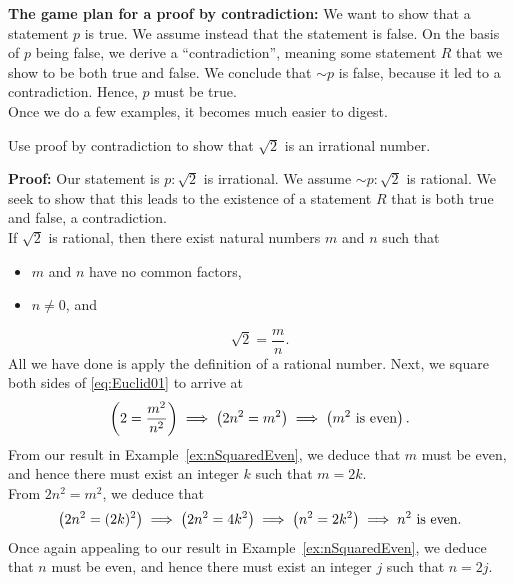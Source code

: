 \textbf{The game plan for a proof by contradiction:} We want to show that a statement $p$ is true. We assume instead that the statement is false. On the basis of $p$ being false, we derive a ``contradiction'', meaning some statement $R$ that we show to be both true and false. We conclude that $\sim p$ is false, because it led to a contradiction. Hence, $p$ must be true.\\

Once we do a few examples, it becomes much easier to digest. 

\vspace*{.2cm}

\begin{example}
Use proof by contradiction to show that $\sqrt{2}$ is an irrational number.
\end{example} 

\vspace*{.2cm}

\textbf{Proof:} Our statement is $p: \sqrt{2}$ is irrational. We assume $\sim p: \sqrt{2}$ is rational. We seek to show that this leads to the existence of a statement $R$ that is both true and false, a contradiction. \\

If $\sqrt{2}$ is rational, then there exist natural numbers $m$ and $n$ such that 
\begin{itemize}
    \item $m$ and $n$ have no common factors, 
    \item $n \neq 0$, and 
\end{itemize}
\begin{equation}
\label{eq:Euclid01}
        \sqrt{2} = \frac{m}{n}.
\end{equation}
All we have done is apply the definition of a rational number. Next, we square both sides of \eqref{eq:Euclid01} to arrive at  
$$ \left(2 = \frac{m^2}{n^2} \right) \implies \left(2n^2 = m^2 \right) \implies \left(m^2\textnormal{ is even}\right).$$ 
From our result in Example~\ref{ex:nSquaredEven}, we deduce that $m$ must be even, and hence there must exist an integer $k$ such that $m=2 k$.\\

From $2 n^2 = m^2$, we deduce that 
$$ \left(2 n^2 = (2 k)^2 \right) \implies \left(2 n^2 = 4 k^2 \right) \implies \left( n^2 = 2 k^2 \right)  \implies n^2  \textnormal{ is even}.$$
Once again appealing to our result in Example~\ref{ex:nSquaredEven}, we deduce that $n$ must be even, and hence there must exist an integer $j$ such that $n=2 j$.\\

